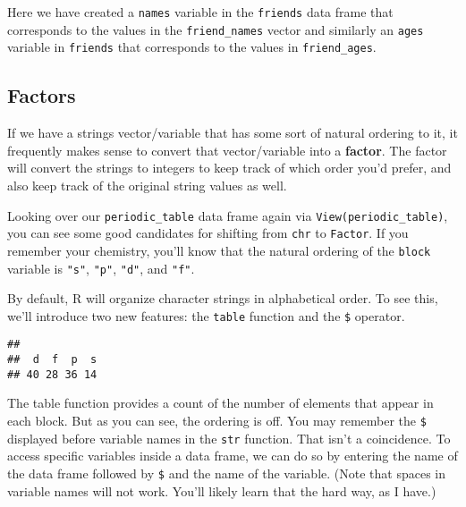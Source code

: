 \documentclass[]{tufte-book}
\newenvironment{Shaded}{\begin{snugshade}}{\end{snugshade}}
\newcommand{\KeywordTok}[1]{\textcolor[rgb]{0.13,0.29,0.53}{\textbf{#1}}}
\newcommand{\NormalTok}[1]{#1}
\newcommand{\OperatorTok}[1]{\textcolor[rgb]{0.81,0.36,0.00}{\textbf{#1}}}
\begin{document}
Here we have created a \texttt{names} variable in the \texttt{friends} data frame that corresponds to the values in the \texttt{friend\_names} vector and similarly an \texttt{ages} variable in \texttt{friends} that corresponds to the values in \texttt{friend\_ages}.

\hypertarget{factors}{%
\subsection{Factors}\label{factors}}

If we have a strings vector/variable that has some sort of natural ordering to it, it frequently makes sense to convert that vector/variable into a \textbf{factor}. The factor will convert the strings to integers to keep track of which order you'd prefer, and also keep track of the original string values as well.

Looking over our \texttt{periodic\_table} data frame again via \texttt{View(periodic\_table)}, you can see some good candidates for shifting from \texttt{chr} to \texttt{Factor}. If you remember your chemistry, you'll know that the natural ordering of the \texttt{block} variable is \texttt{"s"}, \texttt{"p"}, \texttt{"d"}, and \texttt{"f"}.

By default, R will organize character strings in alphabetical order. To see this, we'll introduce two new features: the \texttt{table} function and the \texttt{\$} operator.

\begin{Shaded}
\end{Shaded}

\begin{verbatim}
## 
##  d  f  p  s 
## 40 28 36 14
\end{verbatim}

The table function provides a count of the number of elements that appear in each block. But as you can see, the ordering is off. You may remember the \texttt{\$} displayed before variable names in the \texttt{str} function. That isn't a coincidence. To access specific variables inside a data frame, we can do so by entering the name of the data frame followed by \texttt{\$} and the name of the variable. (Note that spaces in variable names will not work. You'll likely learn that the hard way, as I have.)
\end{document}
